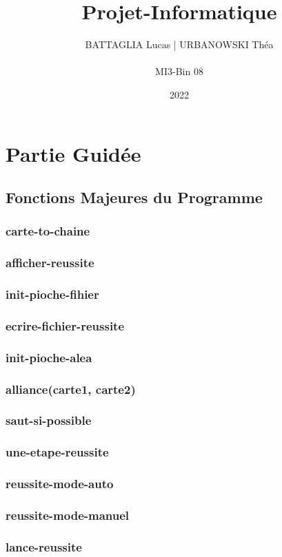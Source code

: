 \documentclass{article}
\title{\huge \textbf{Projet-Informatique}}
\author{BATTAGLIA Lucas | URBANOWSKI Théa \\ \\ MI3-Bin 08}
\date{2022}
\begin{document}
\maketitle
\tableofcontents
\newpage


\section{Partie Guidée}


    \subsection{Fonctions Majeures du Programme}
        \subsubsection{\ttfamily carte-to-chaine}
        \subsubsection{\ttfamily afficher-reussite}
        \subsubsection{\ttfamily init-pioche-fihier}
        \subsubsection{\ttfamily ecrire-fichier-reussite}
        \subsubsection{\ttfamily init-pioche-alea}
        \subsubsection{\ttfamily alliance(carte1, carte2)}
        \subsubsection{\ttfamily saut-si-possible}
        \subsubsection{\ttfamily une-etape-reussite}
        \subsubsection{\ttfamily reussite-mode-auto}
        \subsubsection{\ttfamily reussite-mode-manuel}
        \subsubsection{\ttfamily lance-reussite}
\end{document}
